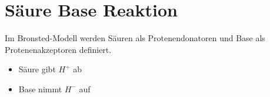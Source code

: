 \section{Säure Base Reaktion} \label{sec:säure_base_reaktion}
Im Bronsted-Modell werden Säuren als Protenendonatoren und Base als Protenenakzeptoren definiert.
\begin{itemize}
    \item Säure gibt $H^+$ ab
    \item Base nimmt $H^-$ auf
\end{itemize}
\


